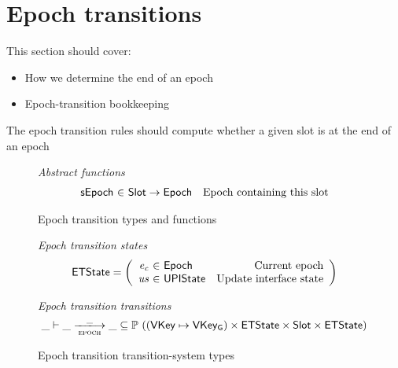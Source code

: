 \documentclass[11pt,a4paper]{article}
\newcommand{\powerset}[1]{\mathbb{P}~#1}
\newcommand{\var}[1]{\mathit{#1}}
\newcommand{\fun}[1]{\mathsf{#1}}
\newcommand{\type}[1]{\mathsf{#1}}
\newcommand{\trans}[2]{\xlongrightarrow[\textsc{#1}]{#2}}
\newcommand{\totalf}{\to}
\newcommand{\Slot}{\type{Slot}}
\newcommand{\VKey}{\type{VKey}}
\newcommand{\VKeyGen}{\type{VKey_G}}
\begin{document}
\section{Epoch transitions}

\newcommand{\Epoch}{\type{Epoch}}

\newcommand{\ETState}{\type{ETState}}
\newcommand{\ETEnv}{\type{ETEnv}}

\newcommand{\sepochname}{sEpoch}
\newcommand{\sepoch}[1]{\fun{\sepochname}\ #1}

\newcommand{\UPIState}{\type{UPIState}}

This section should cover:
\begin{itemize}
\item How we determine the end of an epoch
\item Epoch-transition bookkeeping
\end{itemize}

The epoch transition rules should compute whether a given slot is at the end of
an epoch
\begin{figure}[ht]
  \emph{Abstract functions}
  \begin{equation*}
    \begin{array}{r@{~\in~}lr}
    \fun{\sepochname} & \Slot \totalf \Epoch & \text{Epoch containing this slot} \\
    \end{array}
  \end{equation*}
  \caption{Epoch transition types and functions}
  \label{fig:defs:epoch}
\end{figure}

\begin{figure}[ht]

  \emph{Epoch transition states}
  \begin{equation*}
    \ETState =
    \left(
      \begin{array}{r@{~\in~}lr}
        \var{e_c} & \Epoch & \text{Current epoch} \\
        \var{us} & \UPIState & \text{Update interface state}
      \end{array}
    \right)
  \end{equation*}

  \emph{Epoch transition transitions}
  \begin{equation*}
    \_ \vdash \var{\_} \trans{epoch}{\_} \var{\_} \subseteq
    \powerset ((\VKey \mapsto \VKeyGen) \times \ETState \times \Slot \times \ETState)
  \end{equation*}
  \caption{Epoch transition transition-system types}
  \label{fig:ts-types:epoch}
\end{figure}
\end{document}
